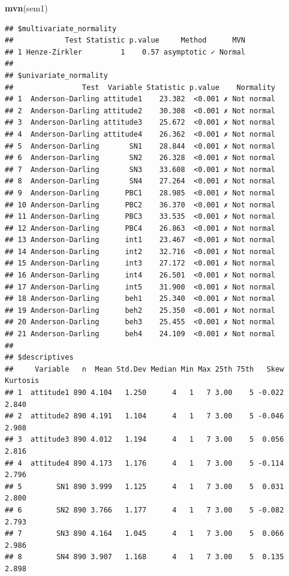 \documentclass[
]{article}
\newenvironment{Shaded}{\begin{snugshade}}{\end{snugshade}}
\newcommand{\FunctionTok}[1]{\textcolor[rgb]{0.13,0.29,0.53}{\textbf{#1}}}
\newcommand{\NormalTok}[1]{#1}
\begin{document}
\begin{Shaded}
\begin{Highlighting}[]
\FunctionTok{mvn}\NormalTok{(sem1)}
\end{Highlighting}
\end{Shaded}

\begin{verbatim}
## $multivariate_normality
##            Test Statistic p.value     Method      MVN
## 1 Henze-Zirkler         1    0.57 asymptotic ✓ Normal
## 
## $univariate_normality
##                Test  Variable Statistic p.value    Normality
## 1  Anderson-Darling attitude1    23.382  <0.001 ✗ Not normal
## 2  Anderson-Darling attitude2    30.308  <0.001 ✗ Not normal
## 3  Anderson-Darling attitude3    25.672  <0.001 ✗ Not normal
## 4  Anderson-Darling attitude4    26.362  <0.001 ✗ Not normal
## 5  Anderson-Darling       SN1    28.844  <0.001 ✗ Not normal
## 6  Anderson-Darling       SN2    26.328  <0.001 ✗ Not normal
## 7  Anderson-Darling       SN3    33.608  <0.001 ✗ Not normal
## 8  Anderson-Darling       SN4    27.264  <0.001 ✗ Not normal
## 9  Anderson-Darling      PBC1    28.985  <0.001 ✗ Not normal
## 10 Anderson-Darling      PBC2    36.370  <0.001 ✗ Not normal
## 11 Anderson-Darling      PBC3    33.535  <0.001 ✗ Not normal
## 12 Anderson-Darling      PBC4    26.863  <0.001 ✗ Not normal
## 13 Anderson-Darling      int1    23.467  <0.001 ✗ Not normal
## 14 Anderson-Darling      int2    32.716  <0.001 ✗ Not normal
## 15 Anderson-Darling      int3    27.172  <0.001 ✗ Not normal
## 16 Anderson-Darling      int4    26.501  <0.001 ✗ Not normal
## 17 Anderson-Darling      int5    31.900  <0.001 ✗ Not normal
## 18 Anderson-Darling      beh1    25.340  <0.001 ✗ Not normal
## 19 Anderson-Darling      beh2    25.350  <0.001 ✗ Not normal
## 20 Anderson-Darling      beh3    25.455  <0.001 ✗ Not normal
## 21 Anderson-Darling      beh4    24.109  <0.001 ✗ Not normal
## 
## $descriptives
##     Variable   n  Mean Std.Dev Median Min Max 25th 75th   Skew Kurtosis
## 1  attitude1 890 4.104   1.250      4   1   7 3.00    5 -0.022    2.840
## 2  attitude2 890 4.191   1.104      4   1   7 3.00    5 -0.046    2.908
## 3  attitude3 890 4.012   1.194      4   1   7 3.00    5  0.056    2.816
## 4  attitude4 890 4.173   1.176      4   1   7 3.00    5 -0.114    2.796
## 5        SN1 890 3.999   1.125      4   1   7 3.00    5  0.031    2.800
## 6        SN2 890 3.766   1.177      4   1   7 3.00    5 -0.082    2.793
## 7        SN3 890 4.164   1.045      4   1   7 3.00    5  0.066    2.986
## 8        SN4 890 3.907   1.168      4   1   7 3.00    5  0.135    2.898

\end{verbatim}
\end{document}
